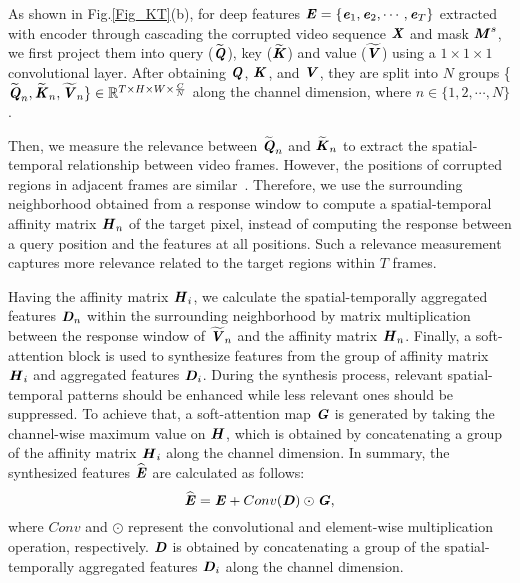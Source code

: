 As shown in Fig.\ref{Fig_KT}(b), for deep features $\textbf{\emph{E}}=\{\textbf{\emph{e}}_1, \textbf{\emph{e}}_2, \cdots,\textbf{\emph{e}}_T\}$ extracted with encoder through cascading the corrupted video sequence $\textbf{\emph{X}}$ and mask $\textbf{\emph{M}}^s$, 
we first project them
into query (${\widetilde{\textbf{\emph{Q}}}}$), key (${\widetilde{\textbf{\emph{K}}}}$) and value (${\widetilde{\textbf{\emph{V}}}}$) using a $1\times1\times1$ convolutional layer.
After obtaining ${\textbf{\emph{Q}}}$, ${\textbf{\emph{K}}}$, and ${\textbf{\emph{V}}}$, they are split into $N$ groups \{$\widetilde{ \textbf{\emph{Q}}}_n, \widetilde{\textbf{\emph{K}}}_n, \widetilde{\textbf{\emph{V}}}_n\} \in \mathbb{R}^{T\times{H}\times{W}\times{\frac{C}{N}}}$
along the channel dimension, 
where $n \in \{1,2,\cdots,N\}$. 

Then, we measure the relevance between $\widetilde{\textbf{\emph{Q}}}_n$ and $\widetilde{\textbf{\emph{K}}}_n$ to extract the spatial-temporal relationship between video frames.
However, the positions of corrupted regions in adjacent frames are similar~\cite{gu2020pyramid,ji2021progressively}. Therefore, we use the surrounding neighborhood obtained from a response window to compute a spatial-temporal affinity matrix ${\textbf{\emph{H}}}_n$ of the target pixel, instead of computing the response between a query position and the features at all positions. 
Such a relevance measurement captures more relevance related to the target regions within $T$ frames. 

Having the affinity matrix ${\textbf{\emph{H}}}_i$, we calculate the spatial-temporally aggregated features ${\textbf{\emph{D}}}_n$ within the surrounding neighborhood by matrix multiplication between the response window of $\widetilde{\textbf{\emph{V}}}_n$ and the affinity matrix ${\textbf{\emph{H}}}_n$. 
Finally, a soft-attention block is used to synthesize features from the group of affinity matrix ${\textbf{\emph{H}}}_i$ and aggregated features ${\textbf{\emph{D}}}_i$. During the synthesis process, relevant spatial-temporal patterns should be enhanced while less relevant ones should be suppressed. To achieve that, a soft-attention map ${\textbf{\emph{G}}}$ is generated by taking the channel-wise maximum value on ${\textbf{\emph{H}}}$, which is obtained by concatenating a group of the affinity matrix ${\textbf{\emph{H}}}_i$ along the channel dimension.
In summary, the synthesized features $\widehat{\textbf{\emph{E}}}$ are calculated as follows:
\begin{equation}
\widehat{\textbf{\emph{E}}}=\textbf{\emph{E}}+Conv(\textbf{\emph{D}})\odot\textbf{\emph{G}},
\label{Inpainted}
\end{equation}
where $Conv$ and $\odot$ represent the convolutional and element-wise multiplication operation, respectively.
$\textbf{\emph{D}}$ is obtained by concatenating a group of the spatial-temporally aggregated features ${\textbf{\emph{D}}}_i$ along the channel dimension.


